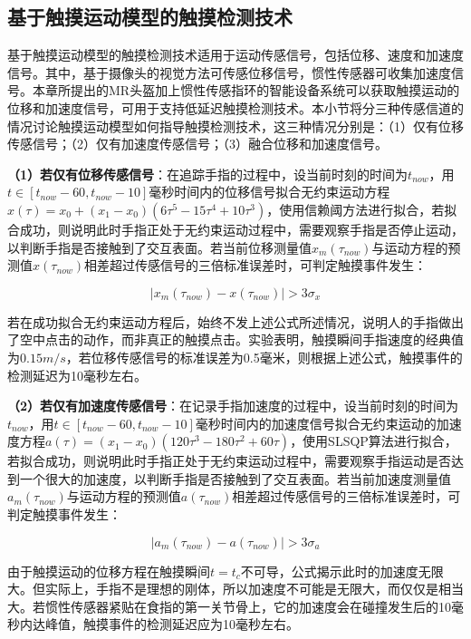\subsection{基于触摸运动模型的触摸检测技术}\label{section:model_TappingRing}

基于触摸运动模型的触摸检测技术适用于运动传感信号，包括位移、速度和加速度信号。其中，基于摄像头的视觉方法可传感位移信号，惯性传感器可收集加速度信号。本章所提出的MR头盔加上惯性传感指环的智能设备系统可以获取触摸运动的位移和加速度信号，可用于支持低延迟触摸检测技术。本小节将分三种传感信道的情况讨论触摸运动模型如何指导触摸检测技术，这三种情况分别是：（1）仅有位移传感信号；（2）仅有加速度传感信号；（3）融合位移和加速度信号。

\textbf{（1）若仅有位移传感信号}：在追踪手指的过程中，设当前时刻的时间为$t_{now}$，用$t\in[t_{now}-60,t_{now}-10]$毫秒时间内的位移信号拟合无约束运动方程$x(\tau)=x_0+(x_1-x_0)(6\tau^5-15\tau^4+10\tau^3)$，使用信赖阈方法\cite{conn2000trust}进行拟合，若拟合成功，则说明此时手指正处于无约束运动过程中，需要观察手指是否停止运动，以判断手指是否接触到了交互表面。若当前位移测量值$x_m(\tau_{now})$与运动方程的预测值$x(\tau_{now})$相差超过传感信号的三倍标准误差时，可判定触摸事件发生：

\begin{equation}
	\lvert x_m(\tau_{now})-x(\tau_{now})\rvert>3\sigma_x
	\label{equ:touch_condition_x}
\end{equation}

若在成功拟合无约束运动方程后，始终不发上述公式所述情况，说明人的手指做出了空中点击的动作，而非真正的触摸点击。实验表明，触摸瞬间手指速度的经典值为$0.15m/s$，若位移传感信号的标准误差为0.5毫米，则根据上述公式，触摸事件的检测延迟为10毫秒左右。

\textbf{（2）若仅有加速度传感信号}：在记录手指加速度的过程中，设当前时刻的时间为$t_{now}$，用$t\in[t_{now}-60,t_{now}-10]$毫秒时间内的加速度信号拟合无约束运动的加速度方程$a(\tau)=(x_1-x_0)(120\tau^3-180\tau^2+60\tau)$，使用SLSQP算法进行拟合，若拟合成功，则说明此时手指正处于无约束运动过程中，需要观察手指运动是否达到一个很大的加速度，以判断手指是否接触到了交互表面。若当前加速度测量值$a_m(\tau_{now})$与运动方程的预测值$a(\tau_{now})$相差超过传感信号的三倍标准误差时，可判定触摸事件发生：

\begin{equation}
	\lvert a_m(\tau_{now})-a(\tau_{now})\rvert>3\sigma_a
	\label{equ:touch_condition_a}
\end{equation}

由于触摸运动的位移方程在触摸瞬间$t=t_c$不可导，公式揭示此时的加速度无限大。但实际上，手指不是理想的刚体，所以加速度不可能是无限大，而仅仅是相当大。若惯性传感器紧贴在食指的第一关节骨上，它的加速度会在碰撞发生后的10毫秒内达峰值，触摸事件的检测延迟应为10毫秒左右。

